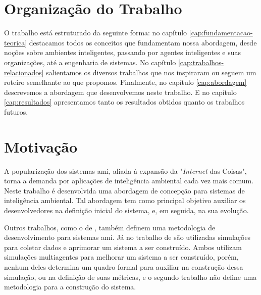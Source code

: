 \section{Organização do Trabalho}
    
O trabalho está estruturado da seguinte forma: no capítulo \ref{cap:fundamentacao-teorica} destacamos todos os conceitos que fundamentam nossa abordagem, desde noções sobre ambientes inteligentes, passando por agentes inteligentes e suas organizações, até a engenharia de sistemas. No capítulo \ref{cap:trabalhos-relacionados} salientamos os diversos trabalhos que nos inspiraram ou seguem um roteiro semelhante ao que propomos. Finalmente, no capítulo \ref{cap:abordagem} descrevemos a abordagem que desenvolvemos neste trabalho. E no capítulo \ref{cap:resultados} apresentamos tanto os resultados obtidos quanto os trabalhos futuros. 
    
\section{Motivação}
\label{sec:motivacao}









A popularização dos sistemas \acrshort{ami}, aliada à expansão da "\textit{Internet} das Coisas", torna a demanda por aplicações de inteligência ambiental cada vez mais comum. 
Neste trabalho é desenvolvida uma abordagem de concepção para sistemas de inteligência ambiental. Tal abordagem tem como principal objetivo auxiliar os desenvolvedores na definição inicial do sistema, e, em seguida, na sua evolução. 
 
Outros trabalhos, como o de , também definem uma metodologia de desenvolvimento para sistemas \acrshort{ami}. Já no trabalho de  são utilizadas simulações para coletar dados e aprimorar um sistema a ser construído. Ambos utilizam simulações multiagentes para melhorar um sistema a ser construído, porém, nenhum deles determina um quadro formal para auxiliar na construção dessa simulação, ou na definição de suas métricas, e o segundo trabalho não define uma metodologia para a construção do sistema. 

